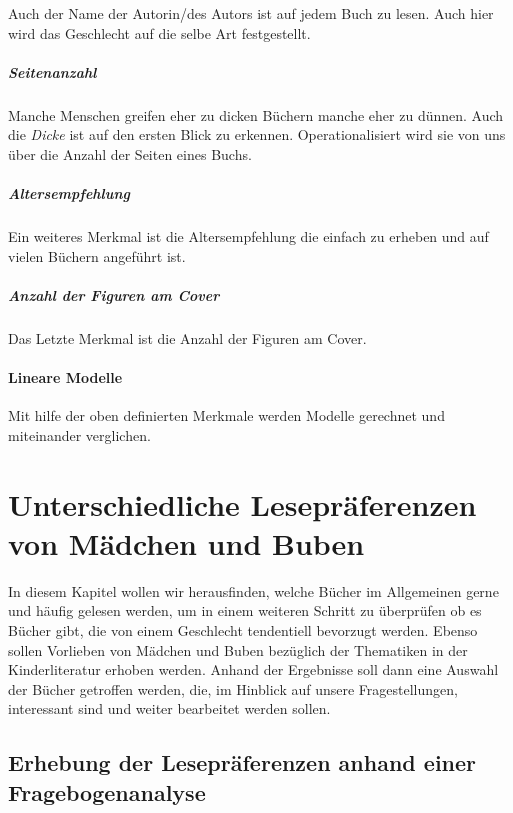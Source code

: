Auch der Name der Autorin/des Autors ist auf jedem Buch zu lesen. Auch
hier wird das Geschlecht auf die selbe Art festgestellt.

\paragraph{Seitenanzahl}

Manche Menschen greifen eher zu dicken Büchern manche eher zu dünnen.
Auch die \emph{Dicke} ist auf den ersten Blick zu erkennen.
Operationalisiert wird sie von uns über die Anzahl der Seiten eines
Buchs.

\paragraph{Altersempfehlung}

Ein weiteres Merkmal ist die Altersempfehlung die einfach zu erheben und
auf vielen Büchern angeführt ist.

\paragraph{Anzahl der Figuren am Cover}

Das Letzte Merkmal ist die Anzahl der Figuren am Cover.

\subsubsection{Lineare Modelle}

Mit hilfe der oben definierten Merkmale werden Modelle gerechnet und
miteinander verglichen.

\chapter{Unterschiedliche Lesepräferenzen von Mädchen und Buben}

In diesem Kapitel wollen wir herausfinden, welche Bücher im Allgemeinen
gerne und häufig gelesen werden, um in einem weiteren Schritt zu
überprüfen ob es Bücher gibt, die von einem Geschlecht tendentiell
bevorzugt werden. Ebenso sollen Vorlieben von Mädchen und Buben
bezüglich der Thematiken in der Kinderliteratur erhoben werden. Anhand
der Ergebnisse soll dann eine Auswahl der Bücher getroffen werden, die,
im Hinblick auf unsere Fragestellungen, interessant sind und weiter
bearbeitet werden sollen.

\section{Erhebung der Lesepräferenzen anhand einer Fragebogenanalyse}

